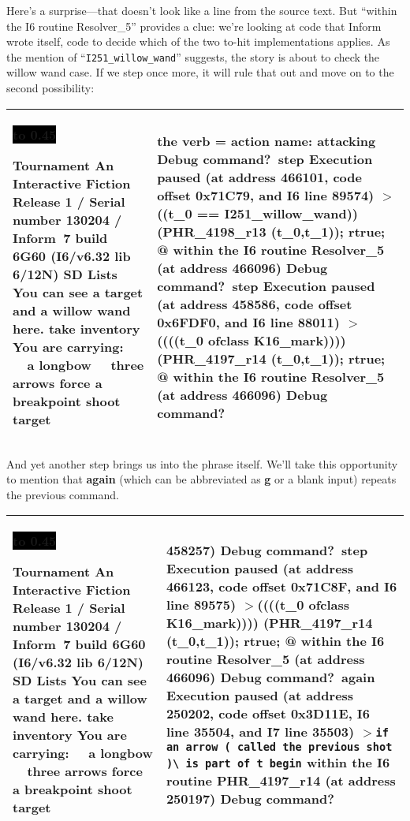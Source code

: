 \documentclass{book}
\newcommand{\n}{\hspace*{\fill}\newline}
\newcommand{\terp}[2]{\begin{center}\begin{tabular}{p{0.45\textwidth}|p{0.45\textwidth}}\midrule #1&#2\\\midrule\end{tabular}\end{center}}
\newcommand{\glkheading}[1]{\textbf{#1}}
\newcommand{\glkinput}[1]{\textbf{#1}}
\newcommand{\glkstatusline}[2]{\centerline{\colorbox{black}{\hbox to 0.45\textwidth{\textcolor{white}{#1\hfil #2}}}}}
\newcommand{\storyprompt}{\raisebox{1.5pt}{\(>\)}}
\newcommand{\cursor}{\raisebox{-1.5pt}{\RectangleThin}}
\newcommand{\markedindent}{\(>\)\qquad}
\begin{document}
Here's a surprise---that doesn't look like a line from the source text.  But
``within the I6 routine Resolver\_5'' provides a clue: we're looking at code
that Inform wrote itself, code to decide which of the two to-hit implementations
applies.  As the mention of ``\lstinline{I251_willow_wand}'' suggests, the story
is about to check the willow wand case.  If we step once more, it will rule that
out and move on to the second possibility:

\terp{\glkstatusline{Lists}{0/2}\n
  \glkheading{Tournament}\n
  An Interactive Fiction\n
  Release 1 / Serial number 130204 / Inform~7 build 6G60 (I6/v6.32 lib 6/12N) SD\n
  \n
  \glkheading{Lists}\n
  You can see a target and a willow wand here.\n
  \n
  \storyprompt\glkinput{take inventory}\n
  You are carrying:\n
  \null\ \ a longbow\n
  \null\ \ three arrows\n
  \n
  \storyprompt\glkinput{force a breakpoint}\n
  \storyprompt\glkinput{shoot target}}{%
  the verb = action name: attacking\n
  \n
  Debug command?\ \glkinput{step}\n
  \n
  Execution paused (at address 466101, code offset 0x71C79, and I6 line 89574)\n
  \markedindent \lstinline@if ((t\_0 == I251\_willow\_wand)) { (PHR\_4198\_r13 (t\_0,t\_1)); rtrue; }@\n
  within the I6 routine Resolver\_5 (at address 466096)\n
  \n
  Debug command?\ \glkinput{step}\n
  \n
  Execution paused (at address 458586, code offset 0x6FDF0, and I6 line 88011)\n
  \markedindent \lstinline@if ((((t\_0 ofclass K16\_mark)))) { (PHR\_4197\_r14 (t\_0,t\_1)); rtrue; }@\n
  within the I6 routine Resolver\_5 (at address 466096)\n
  \n
  Debug command?\ \cursor}

And yet another step brings us into the phrase itself.  We'll take this
opportunity to mention that \glkinput{again} (which can be abbreviated as
\glkinput{g} or a blank input) repeats the previous command.

\terp{\glkstatusline{Lists}{0/2}\n
  \glkheading{Tournament}\n
  An Interactive Fiction\n
  Release 1 / Serial number 130204 / Inform~7 build 6G60 (I6/v6.32 lib 6/12N) SD\n
  \n
  \glkheading{Lists}\n
  You can see a target and a willow wand here.\n
  \n
  \storyprompt\glkinput{take inventory}\n
  You are carrying:\n
  \null\ \ a longbow\n
  \null\ \ three arrows\n
  \n
  \storyprompt\glkinput{force a breakpoint}\n
  \storyprompt\glkinput{shoot target}}{%
  458257)\n
  \n
  Debug command?\ \glkinput{step}\n
  \n
  Execution paused (at address 466123, code offset 0x71C8F, and I6 line 89575)\n
  \markedindent \lstinline@if ((((t\_0 ofclass K16\_mark)))) { (PHR\_4197\_r14 (t\_0,t\_1)); rtrue; }@\n
  within the I6 routine Resolver\_5 (at address 466096)\n
  \n
  Debug command?\ \glkinput{again}\n
  \n
  Execution paused (at address 250202, code offset 0x3D11E, I6 line 35504, and I7 line 35503)\n
  \markedindent \lstinline{if an arrow ( called the previous shot )}\lstinline{\ is part of t begin}\n
  within the I6 routine PHR\_4197\_r14 (at address 250197)\n
  \n
  Debug command?\ \cursor}
\end{document}
